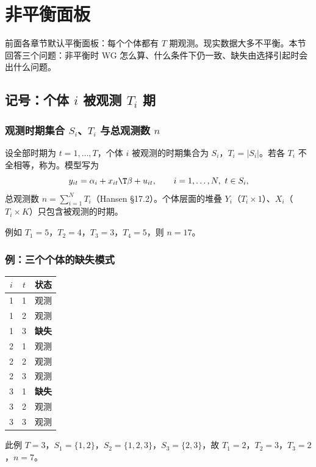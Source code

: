 \section{非平衡面板}\label{sec:U11b-unbal}

前面各章节默认平衡面板：每个个体都有 $T$ 期观测。现实数据大多不平衡。本节回答三个问题：非平衡时 WG 怎么算、什么条件下仍一致、缺失由选择引起时会出什么问题。

\subsection{记号：个体 \texorpdfstring{$i$}{i} 被观测 \texorpdfstring{$T_i$}{T\_i} 期}

\subsubsection{观测时期集合 \texorpdfstring{$S_i$}{S\_i}、\texorpdfstring{$T_i$}{T\_i} 与总观测数 \texorpdfstring{$n$}{n}}

\begin{defn}[非平衡面板]\label{def:U11b-unbal}
设全部时期为 $t=1,\dots,T$，个体 $i$ 被观测的时期集合为 $S_i$，$T_i=|S_i|$。若各 $T_i$ 不全相等，称为。模型写为
\[
y_{it}=\alpha_i+x_{it}\T\beta+u_{it},\qquad i=1,\dots,N,\ t\in S_i ,
\]
总观测数 $n=\sum_{i=1}^NT_i$（Hansen §17.2）。个体层面的堆叠 $Y_i$（$T_i\times1$）、$X_i$（$T_i\times K$）只包含被观测的时期。
\end{defn}
例如 $T_1=5$，$T_2=4$，$T_3=3$，$T_4=5$，则 $n=17$。

\subsubsection{例：三个个体的缺失模式}

\begin{center}
\small
\begin{tabular}{cc|c}
\toprule
$i$ & $t$ & 状态\\
\midrule
1 & 1 & 观测\\
1 & 2 & 观测\\
1 & 3 & \textbf{缺失}\\
2 & 1 & 观测\\
2 & 2 & 观测\\
2 & 3 & 观测\\
3 & 1 & \textbf{缺失}\\
3 & 2 & 观测\\
3 & 3 & 观测\\
\bottomrule
\end{tabular}
\end{center}
此例 $T=3$，$S_1=\{1,2\}$，$S_2=\{1,2,3\}$，$S_3=\{2,3\}$，故 $T_1=2$，$T_2=3$，$T_3=2$，$n=7$。

